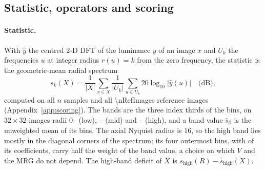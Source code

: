 \subsection{Statistic, operators and scoring}
\label{sec:pricing-ops}

\paragraph{Statistic.}
With $\hat y$ the centred 2-D DFT of the luminance $y$ of an image $x$ and
$U_k$ the frequencies $u$ at integer radius $r(u) = k$ from the zero
frequency, the statistic is the geometric-mean radial spectrum
\begin{equation}
  s_k(X) = \frac{1}{|X|} \sum_{x \in X} \frac{1}{|U_k|}
           \sum_{u \in U_k} 20 \log_{10} \lvert \hat y(u) \rvert
  \quad \text{(dB)},
  \label{eq:statistic}
\end{equation}
computed on all $n$ samples and all \num{\nRefImages} reference images
(Appendix~\ref{app:scoring}). The bands are the three index thirds of the
bins, on $32 \times 32$ images radii $0$--\bandLowMax{} (low),
\bandMidMin--\bandMidMax{} (mid) and \bandHighMin--\bandHighMax{} (high), and
a band value $\bar s_\beta$ is the unweighted mean of its bins. The axial
Nyquist radius is $16$, so the high band lies mostly in the diagonal corners
of the spectrum; its four outermost bins, with \nCoefCorner{} of its
\nCoefHigh{} coefficients, carry half the weight of the band value, a choice
on which $V$ and the MRG do not depend. The high-band deficit of $X$ is
$\bar s_{\mathrm{high}}(R) - \bar s_{\mathrm{high}}(X)$.

